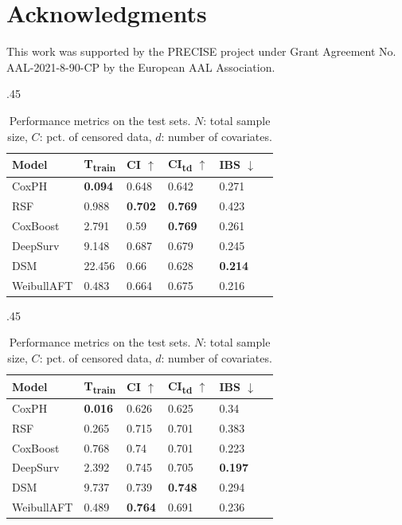 \documentclass[letterpaper]{article} %
\begin{document}
\section{Acknowledgments}
This work was supported by the PRECISE project under Grant Agreement No. AAL-2021-8-90-CP by the European AAL Association.



\begin{table}[!htbp]
\begin{subtable}{.45\textwidth}
\begin{center}
\caption{XJTU ($N=1000$, $C=20\%$, $d=12$).}
\label{subtab:xjtu}
\begin{tabular}{llllll} %
    {Model} & {T\textsubscript{train}} & {CI $\uparrow$} & {CI\textsubscript{td} $\uparrow$} & {IBS $\downarrow$} \\ \midrule
    CoxPH & \textbf{0.094} & 0.648 & 0.642 & 0.271 \\
    RSF & 0.988 & \textbf{0.702} & \textbf{0.769} & 0.423 \\
    CoxBoost & 2.791 & 0.59 & \textbf{0.769} & 0.261\\
    DeepSurv & 9.148 & 0.687 & 0.679 & 0.245\\
    DSM & 22.456 & 0.66 & 0.628 & \textbf{0.214}\\
    WeibullAFT & 0.483 & 0.664 & 0.675 & 0.216\\ \bottomrule
\end{tabular}
\end{center}
\end{subtable}%

\begin{subtable}{.45\textwidth}
\begin{center}
\caption{PRONOSTIA ($N=400$, $C=20\%$, $d=12$).}
\label{subtab:pronostia}
\begin{tabular}{llllll} %
    {Model} & {T\textsubscript{train}} & {CI $\uparrow$} & {CI\textsubscript{td} $\uparrow$} & {IBS $\downarrow$} \\ \midrule
    CoxPH & \textbf{0.016} & 0.626 & 0.625 & 0.34 \\
    RSF & 0.265 & 0.715 & 0.701 & 0.383 \\
    CoxBoost & 0.768 & 0.74 & 0.701 & 0.223\\
    DeepSurv & 2.392 & 0.745 & 0.705 & \textbf{0.197}\\
    DSM & 9.737 & 0.739 & \textbf{0.748} & 0.294\\
    WeibullAFT & 0.489 & \textbf{0.764} & 0.691 & 0.236\\ \bottomrule
\end{tabular}
\end{center}
\end{subtable}
\caption{Performance metrics on the test sets. $N$: total sample size, $C$: pct. of censored data, $d$: number of covariates.}
\label{tab:results}
\end{table}


\clearpage

\end{document}
